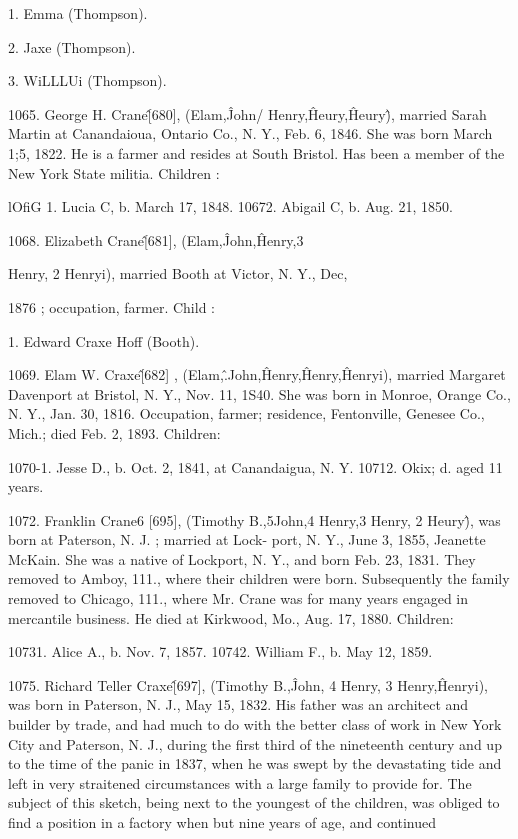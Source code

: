 \documentclass{book}
\begin{document}
1. Emma (Thompson). 

2. Jaxe (Thompson). 

3. WiLLLUi (Thompson). 

1065. George H. Crane\^ [680], (Elam,\^ John/ Henry,\^ 
Heury,\^ Heury\^), married Sarah Martin at Canandaioua, Ontario 
Co., N. Y., Feb. 6, 1846. She was born March 1;5, 1822. He 
is a farmer and resides at South Bristol. Has been a member of 
the New York State militia. Children : 

lOfiG 1. Lucia C, b. March 17, 1848. 
10672. Abigail C, b. Aug. 21, 1850. 

1068. Elizabeth Crane\^ [681], (Elam,\^ John,\^ Henry,3 

Henry, 2 Henryi), married Booth at Victor, N. Y., Dec, 

1876 ; occupation, farmer. Child : 

1. Edward Craxe Hoff (Booth). 

1069. Elam W. Craxe\^ [682] , (Elam,\^ .John,\^ Henry,\^ Henry,\^ 
Henryi), married Margaret Davenport at Bristol, N. Y., Nov. 
11, 1S40. She was born in Monroe, Orange Co., N. Y., Jan. 
30, 1816. Occupation, farmer; residence, Fentonville, Genesee 
Co., Mich.; died Feb. 2, 1893. Children: 

1070-1. Jesse D., b. Oct. 2, 1841, at Canandaigua, N. Y. 
10712. Okix; d. aged 11 years. 

1072. Franklin Crane6 [695], (Timothy B.,5John,4 Henry,3 
Henry, 2 Heury\^), was born at Paterson, N. J. ; married at Lock- 
port, N. Y., June 3, 1855, Jeanette McKain. She was a native 
of Lockport, N. Y., and born Feb. 23, 1831. They removed 
to Amboy, 111., where their children were born. Subsequently the 
family removed to Chicago, 111., where Mr. Crane was for many 
years engaged in mercantile business. He died at Kirkwood, 
Mo., Aug. 17, 1880. Children: 

10731. Alice A., b. Nov. 7, 1857. 
10742. William F., b. May 12, 1859. 

1075. Richard Teller Craxe\^ [697], (Timothy B.,\^ John, 4 
Henry, 3 Henry,\^ Henryi), was born in Paterson, N. J., May 15, 
1832. His father was an architect and builder by trade, and had 
much to do with the better class of work in New York City and 
Paterson, N. J., during the first third of the nineteenth century 
and up to the time of the panic in 1837, when he was swept by 
the devastating tide and left in very straitened circumstances 
with a large family to provide for. The subject of this sketch, 
being next to the youngest of the children, was obliged to find a 
position in a factory when but nine years of age, and continued 
\end{document}
